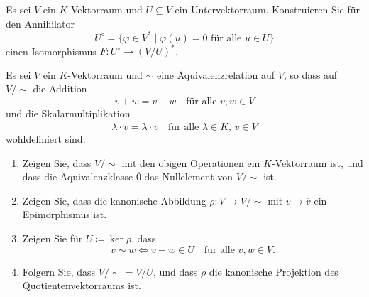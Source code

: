 \begin{question}
  Es sei $V$ ein $K$-Vektorraum und $U \subseteq V$ ein Untervektorraum.
  Konstruieren Sie für den Annihilator
  \[
      U^\circ
    = \{ \varphi \in V^* \mid \text{$\varphi(u) = 0$ für alle $u \in U$} \}
  \]
  einen Isomorphismus $F \colon U^\circ \to (V\!/U)^*$.
\end{question}


\begin{question}
  Es sei $V$ ein $K$-Vektorraum und $\sim$ eine Äquivalenzrelation auf $V$, so dass auf $V/{\sim}$ die Addition
  \[
      \overline{v} + \overline{w}
    = \overline{v + w}
    \quad
    \text{für alle $v, w \in V$}
  \]
  und die Skalarmultiplikation
  \[
      \lambda \cdot \overline{v}
    = \overline{\lambda \cdot v}
    \quad
    \text{für alle $\lambda \in K$, $v \in V$}
  \]
  wohldefiniert sind.
  \begin{enumerate}[leftmargin=*]
    \item
      Zeigen Sie, dass $V\!/{\sim}$ mit den obigen Operationen ein $K$-Vektorraum ist, und dass die Äquivalenzklasse $\overline{0}$ das Nullelement von $V/{\sim}$ ist.
    \item
      Zeigen Sie, dass die kanonische Abbildung $\rho \colon V \to V/{\sim}$ mit $v \mapsto \overline{v}$ ein Epimorphismus ist.
    \item
      Zeigen Sie für $U \coloneqq \ker \rho$, dass
      \[
        v \sim w
        \iff
        v - w \in U
        \quad
        \text{für alle $v, w \in V$}.
      \]
    \item
      Folgern Sie, dass $V\!/{\sim} = V\!/U$, und dass $\rho$ die kanonische Projektion des Quotientenvektorraums ist.
  \end{enumerate}
\end{question}


